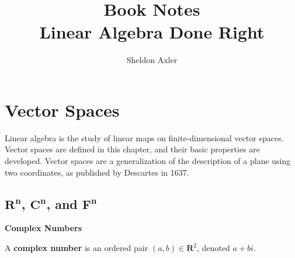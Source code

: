 \documentclass[11pt]{article} %
\title{\huge Book Notes \\ \LARGE {Linear Algebra Done Right}}
\author{Sheldon Axler}
\newcommand\R[1]{\mathbf{R^#1}}
\newcommand\C[1]{\mathbf{C^#1}}
\newcommand\F[1]{\mathbf{F^#1}}
\newenvironment{deff}%
{\begin{Sbox}\begin{tcolorbox}[enhanced,colback=definitions,boxrule=0pt,frame hidden,sharp corners]}%
{\end{tcolorbox}\end{Sbox}\Ovalbox{\TheSbox}}
\begin{document}
\maketitle

\section{Vector Spaces}

Linear algebra is the study of linear maps on finite-dimensional vector spaces. Vector spaces are defined in this chapter, and their basic properties are developed. Vector spaces are a generalization of the description of a plane using two coordinates, as published by Descartes in 1637. 

\subsection{$\R{n}$, $\C{n}$, and $\F{n}$}

\begin{deff}
\textbf {Complex Numbers}

A \textbf{complex number} is an ordered pair $(a,b) \in \mathbf{R}^2$, denoted $a + bi$.
\end{deff}
\end{document}

